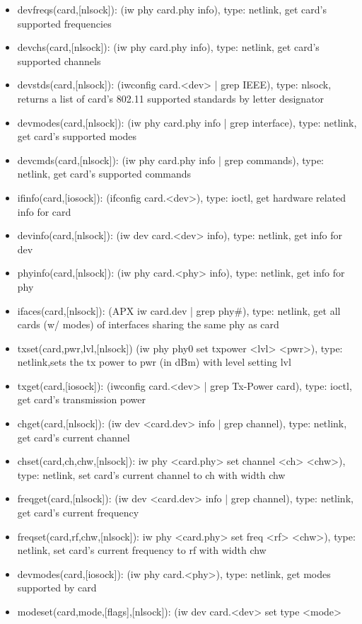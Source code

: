 \documentclass[11pt]{article}
\begin{document}
\begin{appendices}
\begin{itemize}
\item devfreqs(card,[nlsock]): (iw phy card.phy info), type: netlink, get card's 
supported frequencies
\item devchs(card,[nlsock]): (iw phy card.phy info), type: netlink, get card's 
supported channels
\item devstds(card,[nlsock]): (iwconfig card.<dev> | grep IEEE), type: nlsock, 
returns a list of card's 802.11 supported standards by letter designator
\item devmodes(card,[nlsock]): (iw phy card.phy info | grep interface), type:
netlink, get card's supported modes
\item devcmds(card,[nlsock]): (iw phy card.phy info | grep commands), type:
netlink, get card's supported commands
\item ifinfo(card,[iosock]): (ifconfig card.<dev>), type: ioctl, get hardware 
related info for card 
\item devinfo(card,[nlsock]): (iw dev card.<dev> info), type: netlink, get info 
for dev 
\item phyinfo(card,[nlsock]): (iw phy card.<phy> info), type: netlink, get info
for phy
\item ifaces(card,[nlsock]): (APX iw card.dev | grep phy\#), type: netlink, get all
cards (w/ modes) of interfaces sharing the same phy as card
\item txset(card,pwr,lvl,[nlsock]) (iw phy phy0 set txpower <lvl> <pwr>), type: 
netlink,sets the tx power to pwr (in dBm) with level setting lvl 
\item txget(card,[iosock]): (iwconfig card.<dev> | grep Tx-Power card), type: 
ioctl, get card's transmission power
\item chget(card,[nlsock]): (iw dev <card.dev> info | grep channel), type: 
netlink, get card's current channel 
\item chset(card,ch,chw,[nlsock]): iw phy <card.phy> set channel <ch> <chw>), 
type: netlink, set card's current channel to ch with width chw
\item freqget(card,[nlsock]): (iw dev <card.dev> info | grep channel), type: 
netlink, get card's current frequency
\item freqset(card,rf,chw,[nlsock]): iw phy <card.phy> set freq <rf> <chw>), 
type: netlink, set card's current frequency to rf with width chw
\item devmodes(card,[iosock]): (iw phy card.<phy>), type: netlink, get modes 
supported by card
\item modeset(card,mode,[flags],[nlsock]): (iw dev card.<dev> set type <mode> 

\end{itemize}
\end{appendices}
\end{document}
